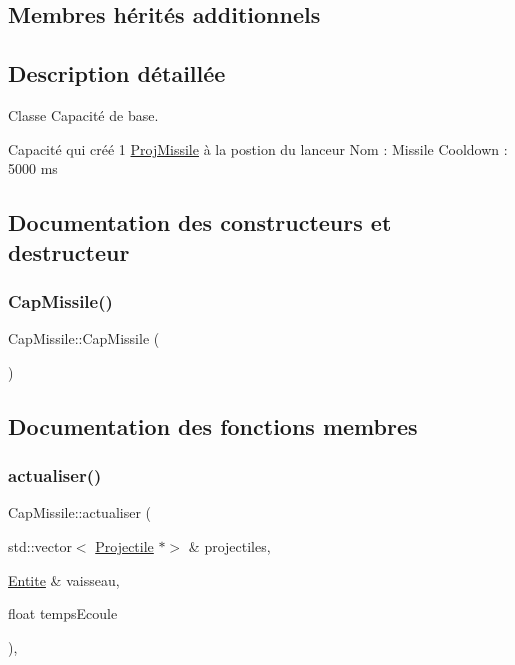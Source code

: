 \subsection*{Membres hérités additionnels}


\subsection{Description détaillée}
Classe Capacité de base. 

Capacité qui créé 1 \hyperlink{class_proj_missile}{Proj\+Missile} à la postion du lanceur Nom \+: Missile Cooldown \+: 5000 ms 

\subsection{Documentation des constructeurs et destructeur}
\mbox{\label{class_cap_missile_a82f039eadaaba1712780a56598daae2a}} 
\subsubsection{\texorpdfstring{Cap\+Missile()}{CapMissile()}}
{\footnotesize\ttfamily Cap\+Missile\+::\+Cap\+Missile (\begin{DoxyParamCaption}{ }\end{DoxyParamCaption})}



\subsection{Documentation des fonctions membres}
\mbox{\label{class_cap_missile_adcb6a35330589c49910e6dd6cc7f2f7d}} 
\subsubsection{\texorpdfstring{actualiser()}{actualiser()}}
{\footnotesize\ttfamily Cap\+Missile\+::actualiser (\begin{DoxyParamCaption}\item[{std\+::vector$<$ \hyperlink{class_projectile}{Projectile} $\ast$$>$ \&}]{projectiles,  }\item[{\hyperlink{class_entite}{Entite} \&}]{vaisseau,  }\item[{float}]{temps\+Ecoule }\end{DoxyParamCaption})\hspace{0.3cm}{\ttfamily [override]}, {\ttfamily [virtual]}}



